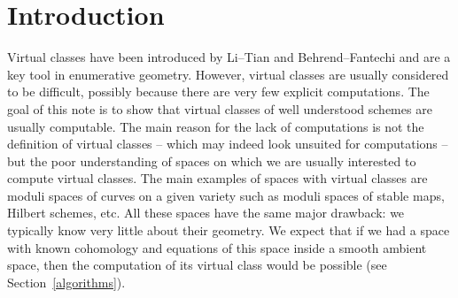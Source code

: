 \documentclass[pdftex]{sigma}
\numberwithin{equation}{section}
\begin{document}
\section{Introduction}
Virtual classes have been introduced by Li--Tian \cite{litian} and Behrend--Fantechi \cite{BerFan} and are a key tool in enumerative geometry. However, virtual classes are usually considered to be difficult, possibly because there are very few explicit computations. The goal of this note is to show that virtual classes of well understood schemes are usually computable. The main reason for the lack of computations is not the definition of virtual classes -- which may indeed look unsuited for computations -- but the poor understanding of spaces on which we are usually interested to compute virtual classes. The main examples of spaces with virtual classes are moduli spaces of curves on a given variety such as moduli spaces of stable maps, Hilbert schemes, etc. All these spaces have the same major drawback: we typically know very little about their geometry. We expect that if we had a space with known cohomology and equations of this space inside a smooth ambient space, then the computation of its virtual class would be possible (see Section~\ref{algorithms}).
\end{document}
